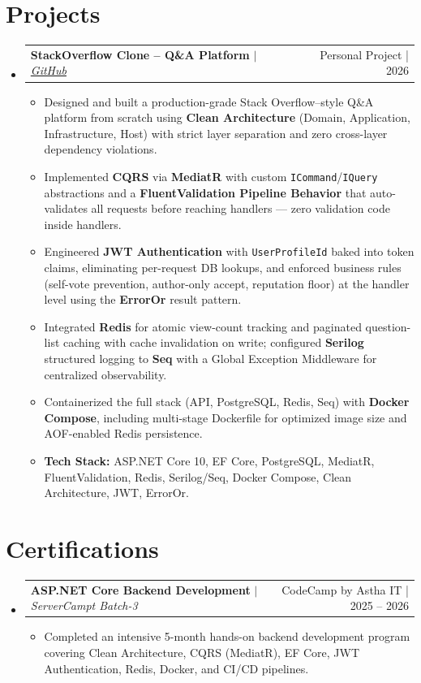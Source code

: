 \documentclass[letterpaper,11pt]{article}
\makeatletter
\newcommand{\resumeItem}[1]{
  \item\small{
    {#1 \vspace{-2pt}}
  }
}
\newcommand{\resumeProjectHeading}[2]{
    \vspace{-2pt}\item
    \begin{tabular*}{0.97\textwidth}{l@{\extracolsep{\fill}}r}
      \small#1 & #2 \\
    \end{tabular*}\vspace{-7pt}
}
\newcommand{\resumeSubHeadingListStart}{\begin{itemize}[leftmargin=0.15in, label={}]}
\newcommand{\resumeSubHeadingListEnd}{\end{itemize}}
\newcommand{\resumeItemListStart}{\begin{itemize}}
\newcommand{\resumeItemListEnd}{\end{itemize}\vspace{-5pt}}
\makeatother
\begin{document}
\section{Projects}
    \vspace{3pt}
    \resumeSubHeadingListStart
      \resumeProjectHeading
          {\textbf{StackOverflow Clone – Q\&A Platform} $|$ \emph{\href{https://github.com/ferdousur/stackoverflow-clone-aspnet}{\color{blue}GitHub}}}{Personal Project | 2026}
          \resumeItemListStart
              \resumeItem{Designed and built a production-grade Stack Overflow–style Q\&A platform from scratch using \textbf{Clean Architecture} (Domain, Application, Infrastructure, Host) with strict layer separation and zero cross-layer dependency violations.}
              \resumeItem{Implemented \textbf{CQRS} via \textbf{MediatR} with custom \texttt{ICommand}/\texttt{IQuery} abstractions and a \textbf{FluentValidation Pipeline Behavior} that auto-validates all requests before reaching handlers — zero validation code inside handlers.}
              \resumeItem{Engineered \textbf{JWT Authentication} with \texttt{UserProfileId} baked into token claims, eliminating per-request DB lookups, and enforced business rules (self-vote prevention, author-only accept, reputation floor) at the handler level using the \textbf{ErrorOr} result pattern.}
              \resumeItem{Integrated \textbf{Redis} for atomic view-count tracking and paginated question-list caching with cache invalidation on write; configured \textbf{Serilog} structured logging to \textbf{Seq} with a Global Exception Middleware for centralized observability.}
              \resumeItem{Containerized the full stack (API, PostgreSQL, Redis, Seq) with \textbf{Docker Compose}, including multi-stage Dockerfile for optimized image size and AOF-enabled Redis persistence.}
              \resumeItem{\textbf{Tech Stack:} ASP.NET Core 10, EF Core, PostgreSQL, MediatR, FluentValidation, Redis, Serilog/Seq, Docker Compose, Clean Architecture, JWT, ErrorOr.}
          \resumeItemListEnd
            
    \resumeSubHeadingListEnd

    \section{Certifications}
      \vspace{3pt}
      \resumeSubHeadingListStart
        
        \resumeProjectHeading
          {\textbf{ASP.NET Core Backend Development} $|$ \emph{ServerCampt Batch-3}}{CodeCamp by Astha IT | 2025 -- 2026}
          \resumeItemListStart
            \resumeItem{Completed an intensive 5-month hands-on backend development program covering Clean Architecture, CQRS (MediatR), EF Core, JWT Authentication, Redis, Docker, and CI/CD pipelines.}
          \resumeItemListEnd

      \resumeSubHeadingListEnd
\end{document}
